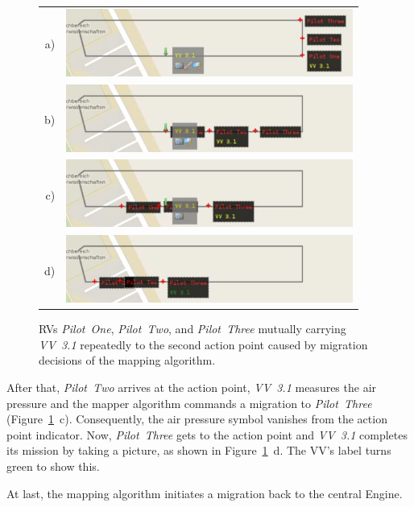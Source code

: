 \begin{figure}[h]
	\begin{center}
		\begin{tabular}{rr}
			a)&{\includegraphics[width=9.4cm]{ese-demo3-5.png}} \\
			b)&{\includegraphics[width=9.4cm]{ese-demo3-6.png}} \\
			c)&{\includegraphics[width=9.4cm]{ese-demo3-7.png}} \\
			d)&{\includegraphics[width=9.4cm]{ese-demo3-8.png}}
		\end{tabular}
	\end{center}
	\caption{\acp{RV} \textit{Pilot~One}, \textit{Pilot~Two}, and \textit{Pilot~Three} mutually carrying
		\textit{VV~3.1} repeatedly to the second action point caused by migration decisions of the mapping
		algorithm.\label{fig:demo3mig04}}
\end{figure}
After that, \textit{Pilot~Two}
arrives at the action point, \textit{VV~3.1} measures the air pressure and the mapper algorithm commands
a migration to \textit{Pilot~Three} (Figure~\ref{fig:demo3mig04}~c).
Consequently, the air pressure symbol vanishes from the action point indicator.
%
Now, \textit{Pilot~Three} gets to the action point and \textit{VV~3.1} completes its mission by 
taking a picture, as shown in Figure~\ref{fig:demo3mig04}~d. The \ac{VV}'s label turns green to show this.

At last, the mapping algorithm initiates a migration back to the central Engine.


